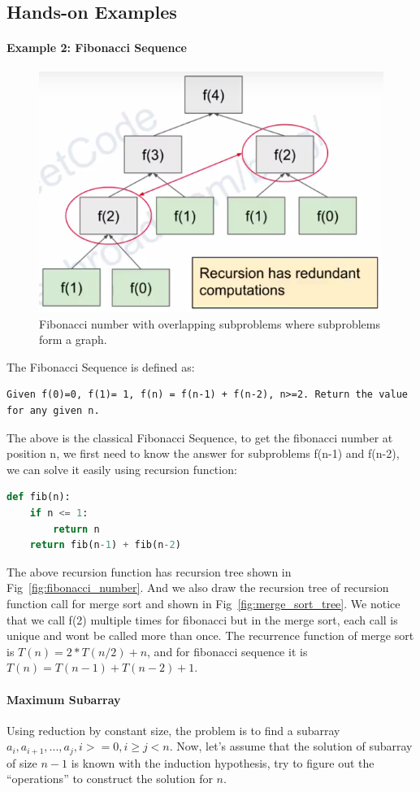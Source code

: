 \documentclass[../main.tex]{subfiles}
\begin{document}
\subsection{Hands-on Examples}
\paragraph{Example 2: Fibonacci Sequence}
\begin{figure}[h!]
    \centering
    \includegraphics[width=0.6\columnwidth]{fig/fibanacci.png}
    \caption{Fibonacci number with overlapping subproblems where subproblems form a graph.}
\label{fig:fibonacci_overlap}
\end{figure}
The Fibonacci Sequence is defined as:
\begin{lstlisting}[numbers=none]
Given f(0)=0, f(1)= 1, f(n) = f(n-1) + f(n-2), n>=2. Return the value for any given n.
\end{lstlisting}
The above is the classical Fibonacci Sequence, to get the fibonacci number at position n, we first need to know the answer for subproblems f(n-1) and f(n-2), we can solve it easily using recursion function:
\begin{lstlisting}[language=Python]
def fib(n):
    if n <= 1:
        return n
    return fib(n-1) + fib(n-2)
\end{lstlisting}
The above recursion function has recursion tree shown in Fig~\ref{fig:fibonacci_number}. And we also draw the recursion tree of recursion function call for merge sort and shown in Fig~\ref{fig:merge_sort_tree}. We notice that we call f(2) multiple times for fibonacci but in the merge sort, each call is unique and wont be called more than once. The recurrence function of merge sort is $T(n) = 2*T(n/2)+n$, and for fibonacci sequence it is $T(n) = T(n-1)+T(n-2)+1$. 

\paragraph{Maximum Subarray} Using reduction by constant size, the problem is to find a subarray $a_i,a_{i+1}, ...,a_{j}, i>=0, i\geq j<n$. Now, let's assume that the solution of subarray of size $n-1$ is known with the induction hypothesis, try to figure out the ``operations'' to construct the solution for $n$.
\end{document}
